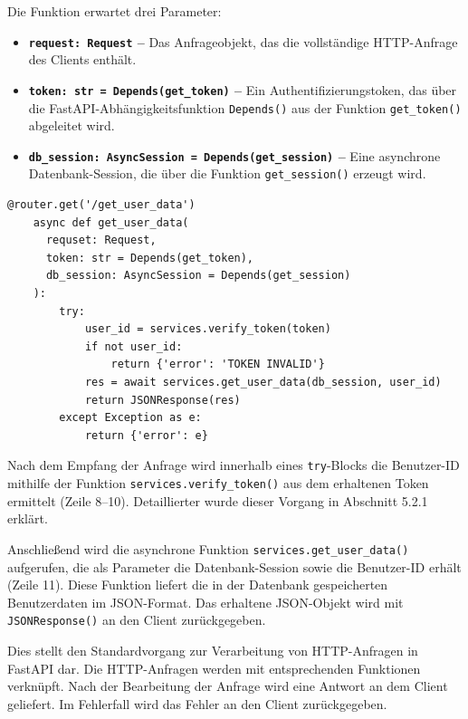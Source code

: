 \documentclass[12pt, letterpaper]{article}
\begin{document}
  \par Die Funktion erwartet drei Parameter:
  \begin{itemize}
  \item \textbf{\texttt{request: Request} –} Das Anfrageobjekt, das die vollständige HTTP-Anfrage des Clients enthält.
  \item \textbf{\texttt{token: str = Depends(get\_token)} –} Ein Authentifizierungstoken, das über die FastAPI-Abhängigkeitsfunktion \texttt{Depends()} aus der Funktion \texttt{get\_token()} abgeleitet wird.
  \item \textbf{\texttt{db\_session: AsyncSession = Depends(get\_session)} –} Eine asynchrone Datenbank-Session, die über die Funktion \texttt{get\_session()} erzeugt wird.
  \end{itemize}
  \begin{lstlisting}[style=mypython, label={lst:getuserdata}, caption={routes.py: get\_user\_data}]
    @router.get('/get_user_data')
    async def get_user_data(
      requset: Request, 
      token: str = Depends(get_token), 
      db_session: AsyncSession = Depends(get_session)
    ):
        try:
            user_id = services.verify_token(token)
            if not user_id:
                return {'error': 'TOKEN INVALID'}
            res = await services.get_user_data(db_session, user_id)
            return JSONResponse(res)
        except Exception as e:
            return {'error': e}
  \end{lstlisting}

  \par Nach dem Empfang der Anfrage wird innerhalb eines \texttt{try}-Blocks die Benutzer-ID mithilfe der Funktion \texttt{services.verify\_token()} aus dem erhaltenen Token ermittelt (Zeile 8–10). Detaillierter wurde dieser Vorgang in Abschnitt 5.2.1 erklärt.
  \par Anschließend wird die asynchrone Funktion \texttt{services.get\_user\_data()} aufgerufen, die als Parameter die Datenbank-Session sowie die Benutzer-ID erhält (Zeile 11). Diese Funktion liefert die in der Datenbank gespeicherten Benutzerdaten im JSON-Format. Das erhaltene JSON-Objekt wird mit \texttt{JSONResponse()} an den Client zurückgegeben.
  \par Dies stellt den Standardvorgang zur Verarbeitung von HTTP-Anfragen in FastAPI dar. Die HTTP-Anfragen werden mit entsprechenden Funktionen verknüpft. Nach der Bearbeitung der Anfrage wird eine Antwort an dem Client geliefert. Im Fehlerfall wird das Fehler an den Client zurückgegeben.
\end{document}
